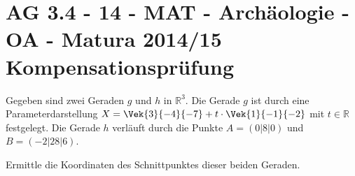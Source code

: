 \section{AG 3.4 - 14 - MAT - Archäologie - OA - Matura 2014/15 Kompensationsprüfung}

\begin{beispiel}[AG 3.4]{1} %
				Gegeben sind zwei Geraden $g$ und $h$ in $\mathbb{R}^{3}$.
				Die Gerade $g$ ist durch eine Parameterdarstellung $X=\Vek{3}{-4}{-7}+t\cdot\Vek{1}{-1}{-2}$ mit $t\in\mathbb{R}$ festgelegt.
				Die Gerade $h$ verläuft durch die Punkte $A=(0|8|0)$ und $B=(-2|28|6)$.
				
				Ermittle die Koordinaten des Schnittpunktes dieser beiden Geraden.
				
\end{beispiel}